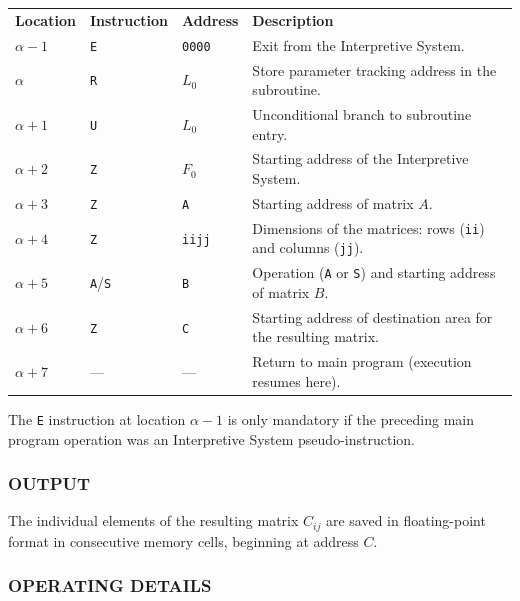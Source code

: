 \documentclass{article}
\begin{document}
\medskip
\noindent
\begin{tabular}{llll}
\textbf{Location} & \textbf{Instruction} & \textbf{Address} & \textbf{Description} \\
$\alpha - 1$      & \texttt{E}            & \texttt{0000}    & Exit from the Interpretive System. \\
$\alpha$          & \texttt{R}            & \texttt{$L_0$}       & Store parameter tracking address in the subroutine. \\
$\alpha + 1$      & \texttt{U}            & \texttt{$L_0$}       & Unconditional branch to subroutine entry. \\
$\alpha + 2$      & \texttt{Z}            & \texttt{$F_0$}       & Starting address of the Interpretive System. \\
$\alpha + 3$      & \texttt{Z}            & \texttt{A}       & Starting address of matrix $A$. \\
$\alpha + 4$      & \texttt{Z}            & \texttt{iijj}    & Dimensions of the matrices: rows (\texttt{ii}) and columns (\texttt{jj}). \\
$\alpha + 5$      & \texttt{A}/\texttt{S} & \texttt{B}       & Operation (\texttt{A} or \texttt{S}) and starting address of matrix $B$. \\
$\alpha + 6$      & \texttt{Z}            & \texttt{C}       & Starting address of destination area for the resulting matrix. \\
$\alpha + 7$      & ---                   & ---              & Return to main program (execution resumes here).
\end{tabular}

\medskip
\noindent
The \texttt{E} instruction at location $\alpha - 1$ is only mandatory if the preceding main program operation was an Interpretive System pseudo-instruction.

\subsubsection*{OUTPUT}
The individual elements of the resulting matrix $C_{ij}$ are saved in floating-point format in consecutive memory cells, beginning at address $C$.

\subsubsection*{OPERATING DETAILS}
\end{document}
